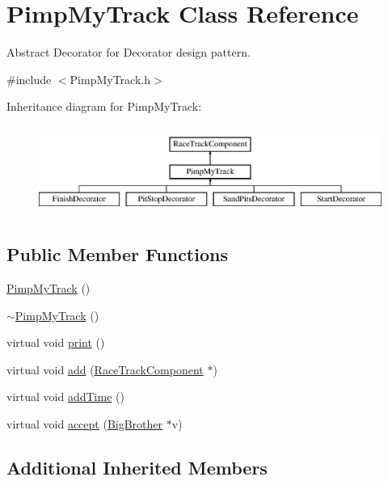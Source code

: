 \hypertarget{class_pimp_my_track}{}\section{Pimp\+My\+Track Class Reference}
\label{class_pimp_my_track}


Abstract Decorator for Decorator design pattern.  




{\ttfamily \#include $<$Pimp\+My\+Track.\+h$>$}

Inheritance diagram for Pimp\+My\+Track\+:\begin{figure}[H]
\begin{center}
\leavevmode
\includegraphics[height=2.916667cm]{class_pimp_my_track}
\end{center}
\end{figure}
\subsection*{Public Member Functions}
\begin{DoxyCompactItemize}
\item 
\mbox{\hyperlink{class_pimp_my_track_a8ec014a005a92b99da9d8280fdd47015}{Pimp\+My\+Track}} ()
\item 
\mbox{\hyperlink{class_pimp_my_track_a58f6be4ae459b68816ef376151161756}{$\sim$\+Pimp\+My\+Track}} ()
\item 
virtual void \mbox{\hyperlink{class_pimp_my_track_a1b292c061991d5797183610f41180b91}{print}} ()
\item 
virtual void \mbox{\hyperlink{class_pimp_my_track_a22126de4605d351960de212f39936051}{add}} (\mbox{\hyperlink{class_race_track_component}{Race\+Track\+Component}} $\ast$)
\item 
virtual void \mbox{\hyperlink{class_pimp_my_track_a79a8b871fe1c71263d8e4f5d091f87a6}{add\+Time}} ()
\item 
virtual void \mbox{\hyperlink{class_pimp_my_track_a26bee1c8ec01b69eedc788d6199be9f4}{accept}} (\mbox{\hyperlink{class_big_brother}{Big\+Brother}} $\ast$v)
\end{DoxyCompactItemize}
\subsection*{Additional Inherited Members}


